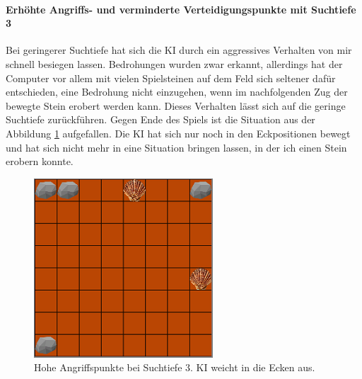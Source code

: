 \paragraph{Erhöhte Angriffs- und verminderte Verteidigungspunkte mit Suchtiefe 3}
Bei geringerer Suchtiefe hat sich die KI durch ein aggressives Verhalten von mir schnell besiegen lassen. Bedrohungen wurden zwar erkannt, allerdings hat der Computer vor allem mit vielen Spielsteinen auf dem Feld sich seltener dafür entschieden, eine Bedrohung nicht einzugehen, wenn im nachfolgenden Zug der bewegte Stein erobert werden kann. Dieses Verhalten lässt sich auf die geringe Suchtiefe zurückführen. Gegen Ende des Spiels ist die Situation aus der Abbildung \ref{fig:nichtschlagbar} aufgefallen. Die KI hat sich nur noch in den Eckpositionen bewegt und hat sich nicht mehr in eine Situation bringen lassen, in der ich einen Stein erobern konnte.
\begin{figure}[h]
	\centering
	\includegraphics{img/Aggro/humannichtzuschlagen2}	
	\caption{Hohe Angriffspunkte bei Suchtiefe 3. KI weicht in die Ecken aus.}
	\label{fig:nichtschlagbar}
\end{figure}
